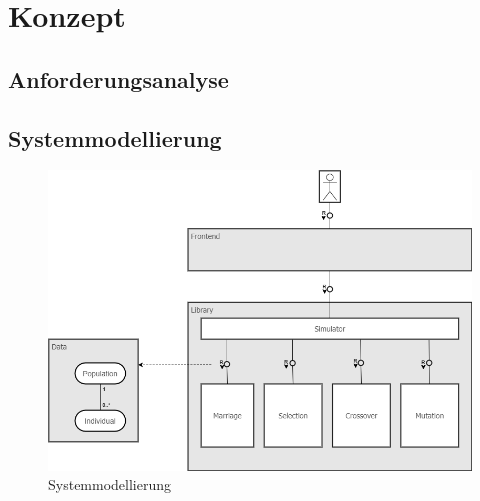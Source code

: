 
\section{Konzept}

\subsection{Anforderungsanalyse}

\subsection{Systemmodellierung}

\begin{figure}[H]
\centering
\includegraphics[width=1\textwidth]{img/Vortrag/Systemmodellierung.png}
\caption{Systemmodellierung}
\label{fig:systemmodellierung}
\end{figure}

